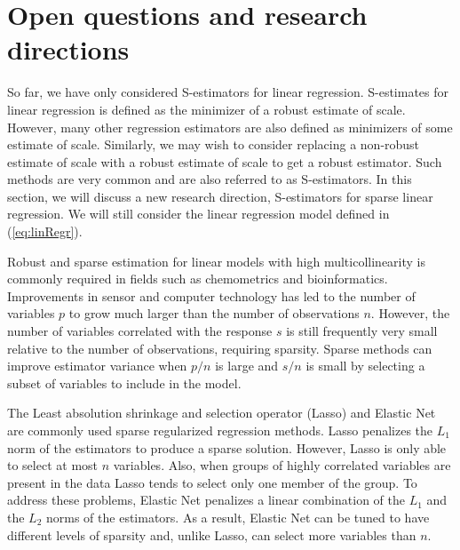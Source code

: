 

\section{Open questions and research directions}

So far, we have only considered S-estimators for linear regression. S-estimates for linear regression is defined as the minimizer of a robust estimate of scale. However, many other regression estimators are also defined as minimizers of some estimate of scale. Similarly, we may wish to consider replacing a non-robust estimate of scale with a robust estimate of scale to get a robust estimator. Such methods are very common and are also referred to as S-estimators. In this section, we will discuss a new research direction, S-estimators for sparse linear regression. We will still consider the linear regression model defined in (\ref{eq:linRegr}).

Robust and sparse estimation for linear models with high multicollinearity is commonly required in fields such as chemometrics and bioinformatics. Improvements in sensor and computer technology has led to the number of variables $p$ to grow much larger than the number of observations $n$. However, the number of variables correlated with the response $s$ is still frequently very small relative to the number of observations, requiring sparsity. Sparse methods can improve estimator variance when $p/n$ is large and $s/n$ is small by selecting a subset of variables to include in the model.

The Least absolution shrinkage and selection operator (Lasso) \cite{tibsLasso} and Elastic Net \cite{hastie2005} are commonly used sparse regularized regression methods. Lasso penalizes the $L_1$ norm of the estimators to produce a sparse solution. However, Lasso is only able to select at most $n$ variables. Also, when groups of highly correlated variables are present in the data Lasso tends to select only one member of the group. To address these problems, Elastic Net penalizes a linear combination of the $L_1$ and the $L_2$ norms of the estimators. As a result, Elastic Net can be tuned to have different levels of sparsity and, unlike Lasso, can select more variables than $n$.

